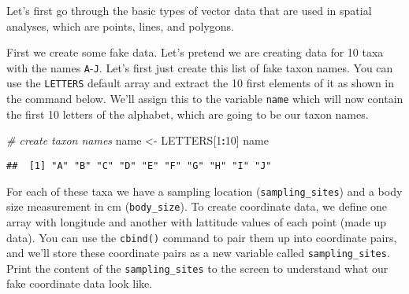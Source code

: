 \documentclass[]{article}
\newenvironment{Shaded}{\begin{snugshade}}{\end{snugshade}}
\newcommand{\CommentTok}[1]{\textcolor[rgb]{0.56,0.35,0.01}{\textit{#1}}}
\newcommand{\DecValTok}[1]{\textcolor[rgb]{0.00,0.00,0.81}{#1}}
\newcommand{\NormalTok}[1]{#1}
\newcommand{\OperatorTok}[1]{\textcolor[rgb]{0.81,0.36,0.00}{\textbf{#1}}}
\newcommand{\StringTok}[1]{\textcolor[rgb]{0.31,0.60,0.02}{#1}}
\begin{document}
Let's first go through the basic types of vector data that are used in
spatial analyses, which are points, lines, and polygons.

First we create some fake data. Let's pretend we are creating data for
10 taxa with the names \texttt{A}-\texttt{J}. Let's first just create
this list of fake taxon names. You can use the \texttt{LETTERS} default
array and extract the 10 first elements of it as shown in the command
below. We'll assign this to the variable \texttt{name} which will now
contain the first 10 letters of the alphabet, which are going to be our
taxon names.

\begin{Shaded}
\begin{Highlighting}[]
\CommentTok{# create taxon names}
\NormalTok{name <-}\StringTok{ }\NormalTok{LETTERS[}\DecValTok{1}\OperatorTok{:}\DecValTok{10}\NormalTok{]}
\NormalTok{name}
\end{Highlighting}
\end{Shaded}

\begin{verbatim}
##  [1] "A" "B" "C" "D" "E" "F" "G" "H" "I" "J"
\end{verbatim}

For each of these taxa we have a sampling location
(\texttt{sampling\_sites}) and a body size measurement in cm
(\texttt{body\_size}). To create coordinate data, we define one array
with longitude and another with lattitude values of each point (made up
data). You can use the \texttt{cbind()} command to pair them up into
coordinate pairs, and we'll store these coordinate pairs as a new
variable called \texttt{sampling\_sites}. Print the content of the
\texttt{sampling\_sites} to the screen to understand what our fake
coordinate data look like.
\end{document}

